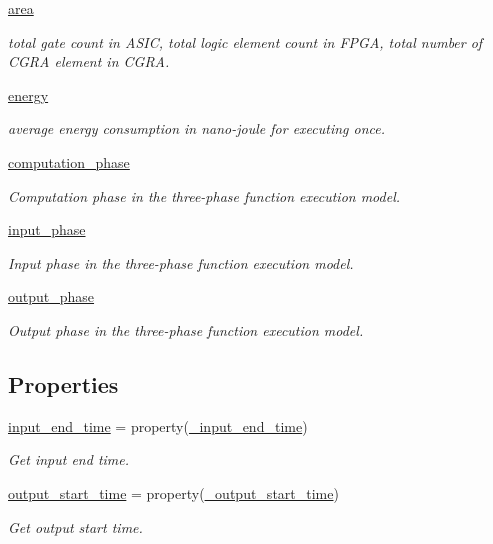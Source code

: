 \begin{DoxyCompactItemize}
\hyperlink{classsylva_1_1base_1_1fimp_1_1_f_i_m_p_cost_afba92218e139335948c9dcba3c9aabd4}{area}
\begin{DoxyCompactList}\small\item\em total gate count in A\+S\+IC, total logic element count in F\+P\+GA, total number of C\+G\+RA element in C\+G\+RA. \end{DoxyCompactList}\item 
\hyperlink{classsylva_1_1base_1_1fimp_1_1_f_i_m_p_cost_a7e0fcf06204dd67fb26243550fa22c68}{energy}
\begin{DoxyCompactList}\small\item\em average energy consumption in nano-\/joule for executing once. \end{DoxyCompactList}\item 
\hyperlink{classsylva_1_1base_1_1fimp_1_1_f_i_m_p_cost_a8e52dbdc89608f7d5b4da0e7538eaa0e}{computation\+\_\+phase}
\begin{DoxyCompactList}\small\item\em Computation phase in the three-\/phase function execution model. \end{DoxyCompactList}\item 
\hyperlink{classsylva_1_1base_1_1fimp_1_1_f_i_m_p_cost_a334924c4d82dc491fbc97c8ec09058ca}{input\+\_\+phase}
\begin{DoxyCompactList}\small\item\em Input phase in the three-\/phase function execution model. \end{DoxyCompactList}\item 
\hyperlink{classsylva_1_1base_1_1fimp_1_1_f_i_m_p_cost_a49cd73cf2ea2a999de46e265c0346f3f}{output\+\_\+phase}
\begin{DoxyCompactList}\small\item\em Output phase in the three-\/phase function execution model. \end{DoxyCompactList}\end{DoxyCompactItemize}
\subsection*{Properties}
\begin{DoxyCompactItemize}
\item 
\hyperlink{classsylva_1_1base_1_1fimp_1_1_f_i_m_p_cost_a0e6de19dbcfa3dee104fd7d469a148eb}{input\+\_\+end\+\_\+time} = property(\hyperlink{classsylva_1_1base_1_1fimp_1_1_f_i_m_p_cost_ab5c4e28ac7b7fb3fd3e14a66a564e989}{\+\_\+input\+\_\+end\+\_\+time})
\begin{DoxyCompactList}\small\item\em Get input end time. \end{DoxyCompactList}\item 
\hyperlink{classsylva_1_1base_1_1fimp_1_1_f_i_m_p_cost_a2f755f827f18025c332335a16607f231}{output\+\_\+start\+\_\+time} = property(\hyperlink{classsylva_1_1base_1_1fimp_1_1_f_i_m_p_cost_a162a87e8f45b84a27b8c7e2503539122}{\+\_\+output\+\_\+start\+\_\+time})
\begin{DoxyCompactList}\small\item\em Get output start time. \end{DoxyCompactList}\end{DoxyCompactItemize}
